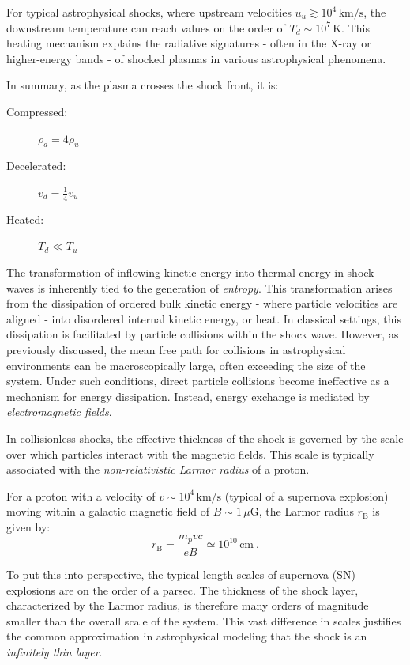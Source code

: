 For typical astrophysical shocks, where upstream velocities \( u_u \gtrsim 10^4 \, \text{km/s} \), the downstream temperature can reach values on the order of \( T_d \sim 10^7 \, \text{K} \). 
%
This heating mechanism explains the radiative signatures - often in the X-ray or higher-energy bands - of shocked plasmas in various astrophysical phenomena.

In summary, as the plasma crosses the shock front, it is:
\begin{remark}
\begin{description}
\item[Compressed:] \( \rho_d = 4 \rho_u \)
\item[Decelerated:] \( v_d = \frac{1}{4} v_u \)
\item[Heated:] \( T_d \ll T_u \)
\end{description}
\end{remark}

The transformation of inflowing kinetic energy into thermal energy in shock waves is inherently tied to the generation of \emph{entropy}. This transformation arises from the dissipation of ordered bulk kinetic energy - where particle velocities are aligned - into disordered internal kinetic energy, or heat. In classical settings, this dissipation is facilitated by particle collisions within the shock wave.
%
However, as previously discussed, the mean free path for collisions in astrophysical environments can be macroscopically large, often exceeding the size of the system. Under such conditions, direct particle collisions become ineffective as a mechanism for energy dissipation. Instead, energy exchange is mediated by \emph{electromagnetic fields}.

In collisionless shocks, the effective thickness of the shock is governed by the scale over which particles interact with the magnetic fields. This scale is typically associated with the \emph{non-relativistic Larmor radius} of a proton.

For a proton with a velocity of \( v \sim 10^4 \, \text{km/s} \) (typical of a supernova explosion) moving within a galactic magnetic field of \( B \sim 1 \, \mu\text{G} \), the Larmor radius \( r_{\text{B}} \) is given by:
%
\[
r_{\text{B}} = \frac{m_p v c}{e B} \simeq 10^{10} \, \text{cm}~.
\]

To put this into perspective, the typical length scales of supernova (SN) explosions are on the order of a parsec. The thickness of the shock layer, characterized by the Larmor radius, is therefore many orders of magnitude smaller than the overall scale of the system. 
%
This vast difference in scales justifies the common approximation in astrophysical modeling that the shock is an \emph{infinitely thin layer}. 

